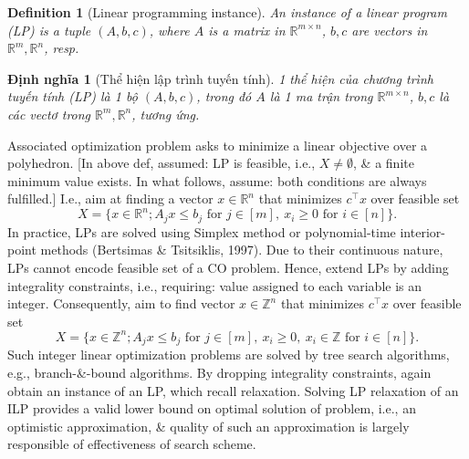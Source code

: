 \documentclass{article}
\newtheorem{definition}{Definition}
\newtheorem{dinhnghia}{Định nghĩa}
\begin{document}
\begin{itemize}
\begin{itemize}
\begin{itemize}
            \begin{definition}[Linear programming instance]
                An instance of a {\rm linear program} (LP) is a tuple $(A,b,c)$, where $A$ is a matrix in $\mathbb{R}^{m\times n}$, $b,c$ are vectors in $\mathbb{R}^m,\mathbb{R}^n$, resp.
            \end{definition}

            \begin{dinhnghia}[Thể hiện lập trình tuyến tính]
                1 thể hiện của {\rm chương trình tuyến tính} (LP) là 1 bộ $(A,b,c)$, trong đó $A$ là 1 ma trận trong $\mathbb{R}^{m\times n}$, $b,c$ là các vectơ trong $\mathbb{R}^m,\mathbb{R}^n$, tương ứng.
            \end{dinhnghia}
            Associated optimization problem asks to minimize a linear objective over a polyhedron. [In above def, assumed: LP is feasible, i.e., $X\ne\emptyset$, \& a finite minimum value exists. In what follows, assume: both conditions are always fulfilled.] I.e., aim at finding a vector $x\in\mathbb{R}^n$ that minimizes $c^\top x$ over feasible set
            \begin{equation*}
                X = \{x\in\mathbb{R}^n;A_jx\le b_j\mbox{ for } j\in[m],\ x_i\ge0\mbox{ for } i\in[n]\}.
            \end{equation*}
            In practice, LPs are solved using Simplex method or polynomial-time interior-point methods (Bertsimas \& Tsitsiklis, 1997). Due to their continuous nature, LPs cannot encode feasible set of a CO problem. Hence, extend LPs by adding integrality constraints, i.e., requiring: value assigned to each variable is an integer. Consequently, aim to find vector $x\in\mathbb{Z}^n$ that minimizes $c^\top x$ over feasible set
            \begin{equation*}
                X = \{x\in\mathbb{Z}^n;A_jx\le b_j\mbox{ for } j\in[m],\ x_i\ge0,\ x_i\in\mathbb{Z}\mbox{ for } i\in[n]\}.
            \end{equation*}
            Such integer linear optimization problems are solved by tree search algorithms, e.g., branch-\&-bound algorithms. By dropping integrality constraints, again obtain an instance of an LP, which recall relaxation. Solving LP relaxation of an ILP provides a valid lower bound on optimal solution of problem, i.e., an optimistic approximation, \& quality of such an approximation is largely responsible of effectiveness of search scheme.


\end{itemize}
\end{itemize}
\end{itemize}
\end{document}
